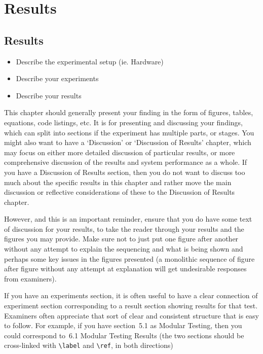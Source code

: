 
\glsresetall %
\chapter[Results]{Results}\label{ch:Results}

\section[Results]{Results}
\begin{itemize}
	\item{Describe the experimental setup (ie. Hardware)}
	\item{Describe your experiments}
	\item{Describe your results}
\end{itemize}

This chapter should generally present your finding in the form of figures, tables, equations, code listings, etc. It is for presenting and discussing your findings, which can split into sections if the experiment has multiple parts, or stages.  You might also want to have a `Discussion' or `Discussion of Results' chapter, which may focus on either more detailed discussion of particular results, or more comprehensive discussion of the results and system performance as a whole.  If you have a Discussion of Results section, then you do not want to discuss too much about the specific results in this chapter and rather move the main discussion or reflective considerations of these to the Discussion of Results chapter.

However, and this is an important reminder, ensure that you do have some text of discussion for your results, to take the reader through your results and the figures you may provide.  Make sure not to just put one figure after another without any attempt to explain the sequencing and what is being shown and perhaps some key issues in the figures presented (a monolithic sequence of figure after figure without any attempt at explanation will get undesirable responses from examiners).

If you have an experiments section, it is often useful to have a clear connection of experiment section corresponding to a result section showing results for that test. Examiners often appreciate that sort of clear and consistent structure that is easy to follow.  For example, if you have section~5.1 as Modular Testing, then you could correspond to~6.1 Modular Testing Results (the two sections should be cross-linked with \verb|\label| and \verb|\ref|, in both directions)

